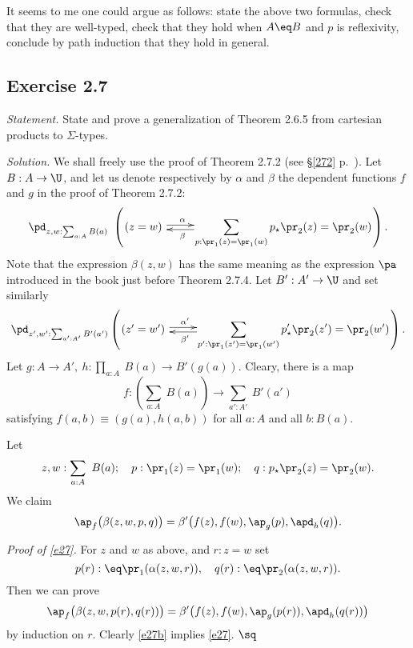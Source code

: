 \documentclass[12pt]{article}
\begin{document}
It seems to me one could argue as follows: state the above two formulas, check that they are well-typed, check that they hold when $A\eq B$ and $p$ is reflexivity, conclude by path induction that they hold in general.



\subsection{Exercise 2.7}

\emph{Statement.} State and prove a generalization of Theorem 2.6.5 from cartesian products to $\Sigma$-types. 

\nn\emph{Solution.} We shall freely use the proof of Theorem 2.7.2 (see \S\ref{272} p.~\pageref{272}). Let $B:A\to\U$, and let us denote respectively by $\alpha$ and $\beta$ the dependent functions $f$ and $g$ in the proof of Theorem 2.7.2:
$$
\pd_{z,w:\sum_{a:A}B(a)}\ \left(\xymatrix@1{
(z=w)\ \ar@<2pt>[r]^(.27)\alpha&\displaystyle\sum_{p:\pr_1(z)=\pr_1(w)}p_\star \pr_2(z)=\pr_2(w)\ar@<2pt>[l]^(.73)\beta}\right).
$$ 
Note that the expression $\beta(z,w)$ has the same meaning as the expression $\pa$ introduced in the book just before Theorem 2.7.4. Let $B':A'\to\U$ and set similarly 
$$
\pd_{z',w':\sum_{a':A'}B'(a')}\left(\xymatrix@1{
(z'=w')\ \ar@<2pt>[r]^(.27){\alpha'}&\displaystyle\sum_{p':\pr_1(z')=\pr_1(w')}p'_\star \pr_2(z')=\pr_2(w')\ar@<2pt>[l]^(.73){\beta'}}\right).
$$ 
Let $g:A\to A',\ h:\prod_{a:A}\ B(a)\to B'(g(a))$. Cleary, there is a map 
$$
f:\left(\sum_{a:A}\ B(a)\right)\to\sum_{a':A'}\ B'(a')
$$ 
satisfying $f(a,b)\equiv (g(a),h(a,b))$ for all $a:A$ and all $b:B(a)$. 

Let 
$$
z,w:\sum_{a:A}\ B(a);\quad p:\pr_1(z)=\pr_1(w);\quad q:p_\star \pr_2(z)=\pr_2(w).
$$ 
We claim 
\begin{equation}\label{e27}
\ap_f\big(\beta(z,w,p,q)\big)=\beta'\big(f(z),f(w),\ap_g(p),\apd_h(q)\big).
\end{equation}

\nn\emph{Proof of \eqref{e27}.} For $z$ and $w$ as above, and $r:z=w$ set 
$$
p(r):\eq\pr_1(\alpha(z,w,r)),\quad q(r):\eq\pr_2(\alpha(z,w,r)).
$$ 
Then we can prove 
\begin{equation}\label{e27b}
\ap_f\big(\beta(z,w,p(r),q(r))\big)=\beta'\big(f(z),f(w),\ap_g(p(r)),\apd_h(q(r))\big)
\end{equation}
by induction on $r$. Clearly \eqref{e27b} implies \eqref{e27}. $\sq$
\end{document}
